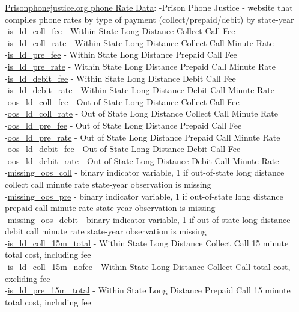 \documentclass[10pt,a4paper]{article}
\begin{document}
\underline{Prisonphonejustice.org phone Rate Data}: 
-Prison Phone Justice - website that compiles phone rates by type of payment (collect/prepaid/debit) by state-year \\
-\underline{is\_ld\_coll\_fee} - Within State Long Distance Collect Call Fee \\
-\underline{is\_ld\_coll\_rate} - Within State Long Distance Collect Call Minute Rate \\
-\underline{is\_ld\_pre\_fee} - Within State Long Distance Prepaid Call Fee \\
-\underline{is\_ld\_pre\_rate} - Within State Long Distance Prepaid Call Minute Rate \\
-\underline{is\_ld\_debit\_fee} - Within State Long Distance Debit Call Fee \\
-\underline{is\_ld\_debit\_rate} - Within State Long Distance Debit Call Minute Rate \\
-\underline{oos\_ld\_coll\_fee} - Out of State Long Distance Collect Call Fee \\
-\underline{oos\_ld\_coll\_rate} - Out of State Long Distance Collect Call Minute Rate \\
-\underline{oos\_ld\_pre\_fee} - Out of State Long Distance Prepaid Call Fee \\
-\underline{oos\_ld\_pre\_rate} - Out of State Long Distance Prepaid Call Minute Rate \\
-\underline{oos\_ld\_debit\_fee} - Out of State Long Distance Debit Call Fee \\
-\underline{oos\_ld\_debit\_rate} - Out of State Long Distance Debit Call Minute Rate \\
-\underline{missing\_oos\_coll} - binary indicator variable, 1 if out-of-state long distance collect call minute rate state-year observation is missing \\
-\underline{missing\_oos\_pre} - binary indicator variable, 1 if out-of-state long distance prepaid call minute rate state-year observation is missing \\
-\underline{missing\_oos\_debit} - binary indicator variable, 1 if out-of-state long distance debit call minute rate state-year observation is missing \\
-\underline{is\_ld\_coll\_15m\_total} - Within State Long Distance Collect Call 15 minute total cost, including fee \\
-\underline{is\_ld\_coll\_15m\_nofee} - Within State Long Distance Collect Call total cost, excliding fee \\
-\underline{is\_ld\_pre\_15m\_total} - Within State Long Distance Prepaid Call 15 minute total cost, including fee \\
\end{document}
